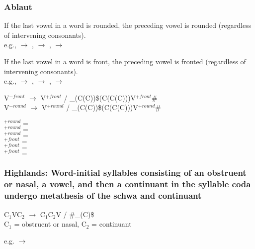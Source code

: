 \subsubsection{Ablaut}

If the last vowel in a word is rounded, the preceding vowel is rounded (regardless of intervening consonants).\\
e.g.,   $\to$ ,   $\to$ ,   $\to$ 

If the last vowel in a word is front, the preceding vowel is fronted (regardless of intervening consonants).\\
e.g.,   $\to$ ,   $\to$ ,   $\to$ 

\begin{center}
    V$^{-front}$ $\to$ V$^{+front}$ / \_(C(C))\$(C(C(C)))V$^{+front}$\#\\
    V$^{-round}$ $\to$ V$^{+round}$ / \_(C(C))\$(C(C(C)))V$^{+round}$\#
\end{center}

\begin{center}
    $^{+round} = $ \\
    $^{+round} = $ \\
    $^{+round} = $ \bripa{\ahoh}\\
    $^{+front} = $ \bripa{\aesh}\\
    $^{+front} = $ \\
    $^{+front} = $ \\
\end{center}

\subsubsection{{\sc Highlands:} Word-initial syllables consisting of an obstruent or nasal, a vowel, and then a continuant in the syllable coda undergo metathesis of the schwa and continuant}

\begin{center}
    C$_1$VC$_2$ $\to$ C$_1$C$_2$V / \#\_(C)\$\\
    C$_1$ = obstruent or nasal, C$_2$ = continuant
\end{center}

e.g.   $\to$ 


\subsubsection{}